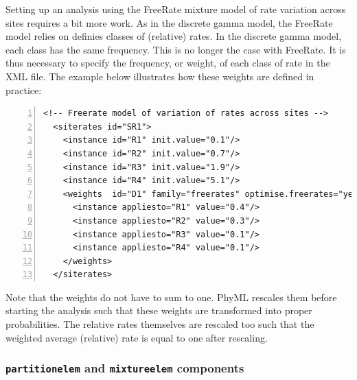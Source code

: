 \documentclass[a4paper,12pt]{article}
\begin{document}
Setting up an analysis using the FreeRate mixture model of rate variation across
sites \cite{soubrier12} requires a
bit more work. As in the discrete gamma model, the FreeRate model relies on definies classes of
(relative) rates. In the discrete gamma model, each class has the same frequency. This is no longer
the case with FreeRate. It is thus necessary to specify the frequency, or weight, of each class of rate in the
XML file. The example below illustrates how these weights are defined in practice:
\vspace{0.2cm}
\begin{Verbatim}[frame=single, label=Example of `siterates' component (FreeRate model), samepage=true,
  baselinestretch=0.5, fontsize=\small, numbers=left]
  <!-- Freerate model of variation of rates across sites -->
  <siterates id="SR1">
    <instance id="R1" init.value="0.1"/>
    <instance id="R2" init.value="0.7"/>
    <instance id="R3" init.value="1.9"/>
    <instance id="R4" init.value="5.1"/>
    <weights  id="D1" family="freerates" optimise.freerates="yes">
      <instance appliesto="R1" value="0.4"/>
      <instance appliesto="R2" value="0.3"/>
      <instance appliesto="R3" value="0.1"/>
      <instance appliesto="R4" value="0.1"/>
    </weights>
  </siterates>
\end{Verbatim}
Note that the weights do not have to sum to one. PhyML rescales them before starting the analysis
such that these weights are transformed into proper probabilities. The relative rates themselves are
rescaled too such that the weighted average (relative) rate is equal to one after rescaling.


\subsubsection{{\tt partitionelem} and {\tt mixtureelem} components}
\end{document}
